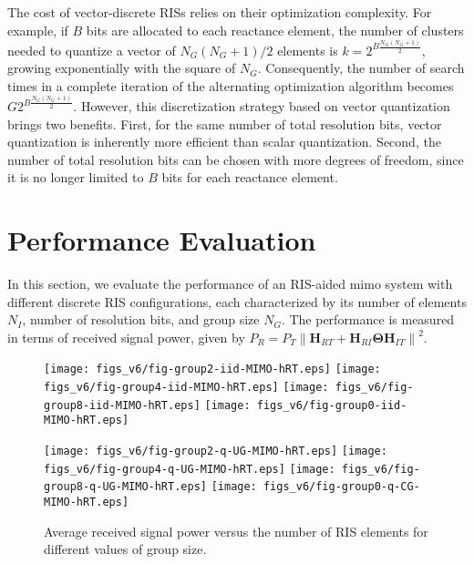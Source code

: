 \documentclass[twocolumn,10pt]{IEEEtran}
\begin{document}
The cost of vector-discrete RISs relies on their optimization complexity.
For example, if $B$ bits are allocated to each reactance element, the number of clusters needed to quantize a vector of $N_{G}\left(N_{G}+1\right)/2$ elements is $k=2^{B\frac{N_{G}\left(N_{G}+1\right)}{2}}$, growing exponentially with the square of $N_{G}$.
Consequently, the number of search times in a complete iteration of the alternating optimization algorithm becomes $G2^{B\frac{N_{G}\left(N_{G}+1\right)}{2}}$.
However, this discretization strategy based on vector quantization brings two benefits.
First, for the same number of total resolution bits, vector quantization is inherently more efficient than scalar quantization.
Second, the number of total resolution bits can be chosen with more degrees of freedom, since it is no longer limited to $B$ bits for each reactance element.

\section{Performance Evaluation}
\label{sec:results}

In this section, we evaluate the performance of an RIS-aided \gls{mimo} system with different discrete RIS configurations, each characterized by its number of elements $N_{I}$, number of resolution bits, and group size $N_{G}$.
The performance is measured in terms of received signal power, given by $P_{R}=P_{T}\left\|\mathbf{H}_{RT}+\mathbf{H}_{RI}\boldsymbol{\Theta}\mathbf{H}_{IT}\right\|^{2}$.

\begin{figure*}[t]
    \begin{centering} %
    \texttt{[image: figs\_v6/fig-group2-iid-MIMO-hRT.eps]}
    \texttt{[image: figs\_v6/fig-group4-iid-MIMO-hRT.eps]}
    \texttt{[image: figs\_v6/fig-group8-iid-MIMO-hRT.eps]}
    \texttt{[image: figs\_v6/fig-group0-iid-MIMO-hRT.eps]}
    \par\end{centering}
    \vspace{0.1cm}
    \begin{centering}
    \texttt{[image: figs\_v6/fig-group2-q-UG-MIMO-hRT.eps]}
    \texttt{[image: figs\_v6/fig-group4-q-UG-MIMO-hRT.eps]}
    \texttt{[image: figs\_v6/fig-group8-q-UG-MIMO-hRT.eps]}
    \texttt{[image: figs\_v6/fig-group0-q-CG-MIMO-hRT.eps]}
    \par\end{centering}
    \caption{Average received signal power versus the number of RIS elements for different values of group size.}
    \label{fig:group-size}
\end{figure*}
\end{document}
